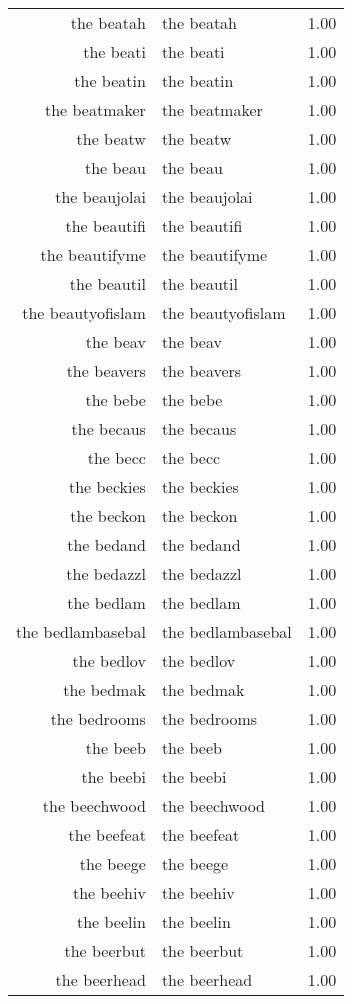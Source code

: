 \begin{table}[ht]
\begin{tabular}{rlr}
  the beatah & the beatah & 1.00 \\ 
  the beati & the beati & 1.00 \\ 
  the beatin & the beatin & 1.00 \\ 
  the beatmaker & the beatmaker & 1.00 \\ 
  the beatw & the beatw & 1.00 \\ 
  the beau & the beau & 1.00 \\ 
  the beaujolai & the beaujolai & 1.00 \\ 
  the beautifi & the beautifi & 1.00 \\ 
  the beautifyme & the beautifyme & 1.00 \\ 
  the beautil & the beautil & 1.00 \\ 
  the beautyofislam & the beautyofislam & 1.00 \\ 
  the beav & the beav & 1.00 \\ 
  the beavers & the beavers & 1.00 \\ 
  the bebe & the bebe & 1.00 \\ 
  the becaus & the becaus & 1.00 \\ 
  the becc & the becc & 1.00 \\ 
  the beckies & the beckies & 1.00 \\ 
  the beckon & the beckon & 1.00 \\ 
  the bedand & the bedand & 1.00 \\ 
  the bedazzl & the bedazzl & 1.00 \\ 
  the bedlam & the bedlam & 1.00 \\ 
  the bedlambasebal & the bedlambasebal & 1.00 \\ 
  the bedlov & the bedlov & 1.00 \\ 
  the bedmak & the bedmak & 1.00 \\ 
  the bedrooms & the bedrooms & 1.00 \\ 
  the beeb & the beeb & 1.00 \\ 
  the beebi & the beebi & 1.00 \\ 
  the beechwood & the beechwood & 1.00 \\ 
  the beefeat & the beefeat & 1.00 \\ 
  the beege & the beege & 1.00 \\ 
  the beehiv & the beehiv & 1.00 \\ 
  the beelin & the beelin & 1.00 \\ 
  the beerbut & the beerbut & 1.00 \\ 
  the beerhead & the beerhead & 1.00 \\ 

\end{tabular}
\end{table}
